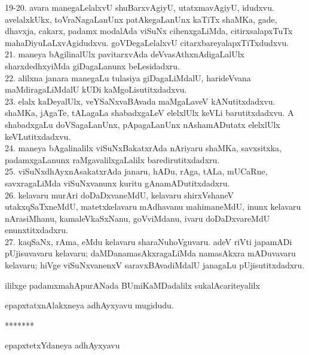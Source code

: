 \documentclass{article}
\begin{document}
19-20. avara manegaLelalxvU shuBarxvAgiyU, utatxmavAgiyU, idudxvu. avelalxkUkx, toVraNagaLanUnx patAkegaLanUnx kaTiTx shaMKa, gade, dhavxja, cakarx, padamx modalAda viSuNx cihenxgaLiMda, citirxsalapxTuTx mahaDiyuLaLxvAgidudxvu. goVDegaLelalxvU citarxbareyalapxTiTxdudxvu.\\
21. maneya bAgilinalUlx pavitarxvAda deVvasAthxnAdigaLalUlx sharxdedhxyiMda giDagaLanunx beLesidadxru.\\
22. alilxna janara manegaLu tulasiya giDagaLiMdalU, harideVvana maMdiragaLiMdalU kUDi kaMgoLisutitxdadxvu.\\
23. elalx kaDeyalUlx, veYSaNxvaBAvada maMgaLaveV kANutitxdadxvu. shaMKa, jAgaTe, tALagaLa shabadxgaLeV elelxlUlx keVLi barutitxdadxvu. A shabadxgaLu doVSagaLanUnx, pApagaLanUnx nAshamADutatx elelxlUlx keVLutitxdadxvu.\\
24. maneya bAgalinalilx viSuNxBakatxrAda nAriyaru shaMKa, savxsitxka, padamxgaLanunx raMgavalilxgaLalilx baredirutitxdadxru.\\
25. viSuNxdhAyxnAsakatxrAda janaru, hADu, rAga, tALa, mUCaRne, savxragaLiMda viSuNxvanunx kuritu gAnamADutitxdadxru.\\
26. kelavaru murAri doDaDxvaneMdU, kelavaru shirxVshaneV utakxqSaTxneMdU, matetxkelavaru mAdhavanu mahimaneMdU, inunx kelavaru nArasiMhanu, kamaleVkaSxNanu, goVviMdanu, ivaru doDaDxvareMdU enunxtitxdadxru.\\
27. kaqSaNx, rAma, eMdu kelavaru sharaNuhoVguvaru. adeV riVti japamADi pUjisuvavaru kelavaru; daMDanamasAkxragaLiMda namasAkxra mADuvavaru kelavaru; hiVge viSuNxvanenxV saravxBAvadiMdalU janagaLu pUjisutitxdadxru.\\

\begin{center}
ililxge padamxmahApurANada BUmiKaMDadalilx sukalAcariteyalilx
\end{center}

\begin{center}
epapxtatxnAlakxneya adhAyxyavu mugidudu.
\end{center}

\begin{center}
*******
\end{center}

\begin{center}
epapxtetxYdaneya adhAyxyavu
\end{center}
\end{document}
